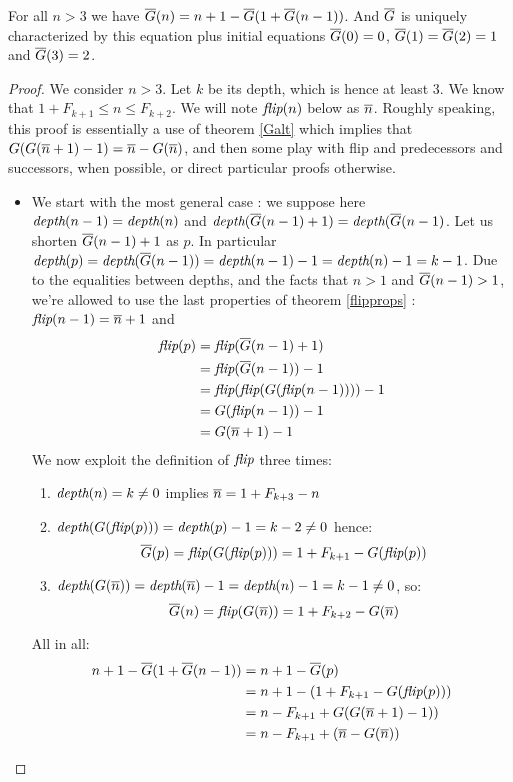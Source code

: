 \documentclass[a4paper,11pt]{article}
\begin{document}
\begin{theorem}\label{FGeqn}
For all $n>3$ we have $\overline{G}(n) = n+1 - \overline{G}(1+\overline{G}(n-1))$.
And $\overline{G}$ is uniquely characterized by this equation
plus initial equations $\overline{G}(0)=0$, $\overline{G}(1)=\overline{G}(2)=1$ and
$\overline{G}(3)=2$.
\end{theorem}
\begin{proof}
We consider $n>3$. Let $k$ be its depth, which is hence at
least 3. We know that $1+F_{k+1} \le n \le F_{k+2}$. We will note
$\textit{flip}(n)$ below as $\overline{n}$. Roughly speaking, this proof is
essentially a use of theorem \ref{Galt} which implies that
$G(G(\overline{n}+1)-1) = \overline{n} - G(\overline{n})$, and then some
play with flip and predecessors and successors, when possible,
or direct particular proofs otherwise.
\begin{itemize}
\item We start with the most general case : we suppose here
$\textit{depth}(n-1)=\textit{depth}(n)$ and $\textit{depth}(\overline{G}(n-1)+1)=\textit{depth}(\overline{G}(n-1)$.
Let us shorten $\overline{G}(n-1)+1$ as $p$. In particular
$\textit{depth}(p)=\textit{depth}(\overline{G}(n-1))=\textit{depth}(n-1)-1=\textit{depth}(n)-1=k-1$.
Due to the equalities between depths, and the facts that
$n>1$ and $\overline{G}(n-1)>1$, we're allowed to use the
last properties of theorem \ref{flipprops} : $\textit{flip}(n-1)=\overline{n}+1$ and
\begin{align*}
\textit{flip}(p) &= \textit{flip}(\overline{G}(n-1)+1) \\
        &= \textit{flip}(\overline{G}(n-1))-1 \\
        &= \textit{flip}(\textit{flip}(G(\textit{flip}(n-1))))-1 \\
        &= G(\textit{flip}(n-1))-1 \\
        &= G(\overline{n}+1)-1
\end{align*}
We now exploit the definition of $\textit{flip}$ three times:
\begin{enumerate}
\item $\textit{depth}(n)=k\neq 0$ implies $\overline{n}=1+F_{k+3}-n$
\item $\textit{depth}(G(\textit{flip}(p)))=\textit{depth}(p)-1=k-2 \neq 0$ hence:
$$\overline{G}(p) = \textit{flip}(G(\textit{flip}(p))) = 1+F_{k+1}-G(\textit{flip}(p))$$
\item $\textit{depth}(G(\overline{n}))=\textit{depth}(\overline{n})-1=\textit{depth}(n)-1=k-1 \neq 0$, so:
$$\overline{G}(n)=\textit{flip}(G(\overline{n}))=1+F_{k+2}-G(\overline{n})$$
\end{enumerate}
All in all:
\begin{align*}
n+1-\FG(1+\FG(n-1)) & = n+1-\FG(p) \\
                    & = n+1-(1+F_{k+1}-G(\flip(p))) \\
                    & = n-F_{k+1}+G(G(\nn+1)-1)) \\
                    & = n-F_{k+1}+(\nn-G(\nn)) \\

\end{align*}
\end{itemize}
\end{proof}
\end{document}

